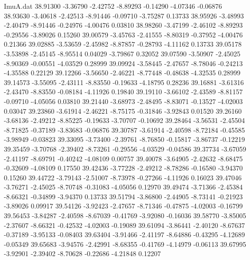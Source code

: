 \begin{filecontents}{ImuA.dat}
  38.91300   -3.36790   -2.42752   -8.89293   -0.14290   -4.07346   -0.06876
  38.93630   -3.40618   -2.42513   -8.91446   -0.09710   -3.75287    0.13733
  38.95926   -3.48993   -2.40479   -8.91446   -0.24976   -4.00476    0.03810
  38.98260   -3.47199   -2.46102   -8.89293   -0.29556   -3.89026    0.15260
  39.00579   -3.45763   -2.41555   -8.80319   -0.37952   -4.00476    0.21366
  39.02885   -3.53659   -2.45982   -8.87857   -0.28793   -4.11162    0.13733
  39.05178   -3.53898   -2.45145   -8.95514    0.04029   -3.79867    0.32052
  39.07590   -3.50907   -2.45025   -8.90369   -0.00551   -4.03529    0.28999
  39.09924   -3.58445   -2.47657   -8.78046   -0.24213   -4.35588    0.22129
  39.12266   -3.56650   -2.46221   -8.77448   -0.48638   -4.32535    0.28999
  39.14573   -3.55095   -2.43111   -8.83550   -0.19633   -4.18795    0.28236
  39.16881   -3.61316   -2.43470   -8.83550   -0.08184   -4.11926    0.19840
  39.19110   -3.66102   -2.43589   -8.81157   -0.09710   -4.05056    0.03810
  39.21440   -3.68973   -2.48495   -8.83071   -0.13527   -4.02003    0.03047
  39.23860   -3.61914   -2.46221   -8.75175   -0.31846   -3.92843    0.01520
  39.26160   -3.68136   -2.49212   -8.85225   -0.19633   -3.70707   -0.10692
  39.28464   -3.56531   -2.45504   -8.71825   -0.37189   -3.83683   -0.06876
  39.30787   -3.61914   -2.40598   -8.72184   -0.45585   -3.98949   -0.03823
  39.33095   -3.73400   -2.39761   -8.76850   -0.15817   -3.86737   -0.12219
  39.35459   -3.70768   -2.39402   -8.73261   -0.29556   -4.03529   -0.04586
  39.37734   -3.67059   -2.41197   -8.69791   -0.40242   -4.08109    0.00757
  39.40078   -3.64905   -2.42632   -8.68475   -0.32609   -4.08109    0.17550
  39.42436   -3.77228   -2.49212   -8.78286   -0.16580   -3.94370    0.15260
  39.44722   -3.79143   -2.51007   -8.73978   -0.27266   -4.11926    0.16023
  39.47046   -3.76271   -2.45025   -8.70748   -0.31083   -4.05056    0.12970
  39.49474   -3.71366   -2.45384   -8.66321   -0.34899   -3.94370    0.13733
  39.51794   -3.86800   -2.44905   -8.73141   -0.21923   -3.89026    0.09917
  39.54126   -3.92423   -2.47657   -8.71346   -0.47875   -4.02003   -0.16799
  39.56453   -3.84287   -2.40598   -8.67039   -0.41769   -3.92080   -0.16036
  39.58770   -3.85005   -2.37607   -8.66321   -0.42532   -4.02003   -0.19089
  39.61094   -3.86441   -2.40120   -8.67637   -0.37189   -3.95133   -0.08403
  39.63404   -3.91466   -2.41197   -8.64886   -0.43295   -4.12689   -0.05349
  39.65683   -3.94576   -2.42991   -8.68355   -0.41769   -4.14979   -0.06113
  39.67995   -3.92901   -2.39402   -8.70628   -0.22686   -4.21848    0.12207

\end{filecontents}
